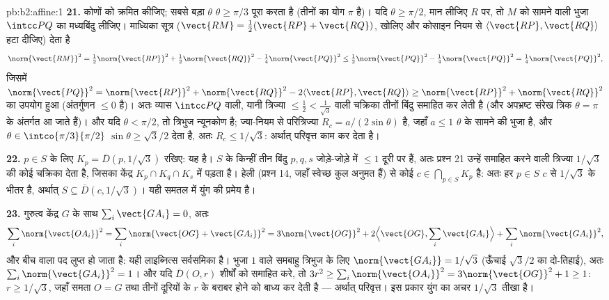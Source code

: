 \begin{solution}{pb:b2:affine:1}
\textbf{21.} कोणों को क्रमित कीजिए; सबसे बड़ा $\theta$ $\theta \geq \pi/3$ पूरा करता है (तीनों
का योग $\pi$ है)। यदि $\theta \geq \pi/2$, मान लीजिए $R$ पर, तो $M$ को सामने वाली भुजा $\intcc PQ$
का मध्यबिंदु लीजिए। माध्यिका सूत्र ($\vect{RM}
= \tfrac12(\vect{RP} + \vect{RQ})$, खोलिए और कोसाइन नियम से $\langle\vect{RP}, \vect{RQ}\rangle$ हटा
दीजिए) देता है
\[
\norm{\vect{RM}}^2 = \tfrac12\norm{\vect{RP}}^2 +
\tfrac12\norm{\vect{RQ}}^2 - \tfrac14\norm{\vect{PQ}}^2 \leq
\tfrac12\norm{\vect{PQ}}^2 - \tfrac14\norm{\vect{PQ}}^2 =
\tfrac14\norm{\vect{PQ}}^2,
\]
जिसमें $\norm{\vect{PQ}}^2 = \norm{\vect{RP}}^2 +
\norm{\vect{RQ}}^2 - 2\langle\vect{RP}, \vect{RQ}\rangle \geq
\norm{\vect{RP}}^2 + \norm{\vect{RQ}}^2$ का उपयोग हुआ (अंतर्गुणन $\leq 0$ है)। अतः व्यास $\intcc PQ$ वाली, यानी
त्रिज्या $\leq \tfrac12 < \tfrac1{\sqrt3}$ वाली चक्रिका तीनों बिंदु समाहित कर लेती है (और अपभ्रष्ट
संरेख त्रिक $\theta = \pi$ के अंतर्गत आ जाते हैं)। और यदि $\theta < \pi/2$, तो त्रिभुज न्यूनकोण
है; ज्या-नियम से परित्रिज्या $R_c = a/(2\sin\theta)$ है, जहाँ $a \leq 1$ $\theta$ के सामने की भुजा है,
और $\theta \in
\intco{\pi/3}{\pi/2}$ $\sin\theta \geq \sqrt3/2$ देता है, अतः $R_c \leq 1/\sqrt3$: अर्थात् परिवृत्त काम कर देता है।

\textbf{22.} $p \in S$ के लिए $K_p = \overline D(p,
1/\sqrt3)$ रखिए: यह   है। $S$ के किन्हीं तीन
बिंदु $p, q, s$ जोड़े-जोड़े में $\leq 1$ दूरी पर हैं, अतः प्रश्न 21 उन्हें समाहित
करने वाली त्रिज्या $1/\sqrt3$ की कोई चक्रिका देता है, जिसका केंद्र $K_p \cap K_q \cap K_s$ में पड़ता
है।  हेली (प्रश्न 14, जहाँ स्वेच्छ कुल अनुमत हैं) से कोई $c \in \bigcap_{p\in
S}K_p$ है: अतः
हर $p \in S$ $c$ से $1/\sqrt3$ के भीतर है, अर्थात् $S
\subseteq \overline D(c, 1/\sqrt3)$। यही समतल में युंग की प्रमेय
है।

\textbf{23.} गुरुत्व केंद्र $G$ के साथ $\sum_i\vect{GA_i} = 0$, अतः
\[
\sum_i\norm{\vect{OA_i}}^2 = \sum_i\norm{\vect{OG} +
\vect{GA_i}}^2 = 3\norm{\vect{OG}}^2 + 2\Bigl\langle
\vect{OG}, \sum_i\vect{GA_i}\Bigr\rangle +
\sum_i\norm{\vect{GA_i}}^2,
\]
और बीच वाला पद लुप्त हो जाता है: यही लाइब्नित्स सर्वसमिका है। भुजा $1$
वाले समबाहु त्रिभुज के लिए $\norm{\vect{GA_i}} =
1/\sqrt3$ (ऊँचाई $\sqrt3/2$ का दो-तिहाई), अतः $\sum_i\norm{\vect{GA_i}}^2 = 1$। और यदि
$\overline D(O, r)$ शीर्षों को समाहित करे, तो $3r^2 \geq
\sum_i\norm{\vect{OA_i}}^2 = 3\norm{\vect{OG}}^2 + 1 \geq 1$: $r \geq 1/\sqrt3$, जहाँ समता $O = G$ तथा तीनों दूरियों
के $r$ के बराबर होने को बाध्य कर देती है --- अर्थात् परिवृत्त। इस प्रकार
युंग का अचर $1/\sqrt3$ तीखा है।


\end{solution}
